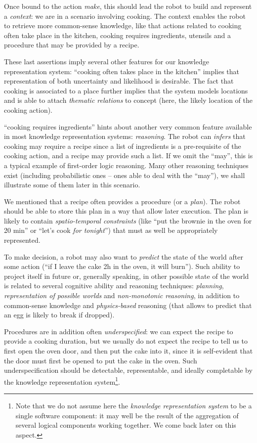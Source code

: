 \documentclass[a4paper, twocolumn]{article}
\begin{document}
Once bound to the action \emph{make}, this should lead the robot to build and
represent a \emph{context}: we are in a scenario involving cooking. The context
enables the robot to retrieve more common-sense knowledge, like that actions
related to cooking often take place in the kitchen, cooking requires
ingredients, utensils and a procedure that may be provided by a recipe.

These last assertions imply several other features for our knowledge
representation system: ``cooking often takes place in the kitchen'' implies
that representation of both uncertainty and likelihood is desirable. The fact
that cooking is associated to a place further implies that the system models
locations and is able to attach \emph{thematic relations} to concept
(here, the likely location of the cooking action).

``cooking requires ingredients'' hints about another very common feature
available in most knowledge representation systems: \emph{reasoning}. The robot
can \emph{infers} that cooking may require a recipe since a list of ingredients
is a pre-requisite of the cooking action, and a recipe may provide such a list.
If we omit the ``may'', this is a typical example of first-order logic
reasoning. Many other reasoning techniques exist (including probabilistic ones
-- ones able to deal with the ``may''), we shall illustrate some of them later
in this scenario.

We mentioned that a recipe often provides a procedure (or a \emph{plan}). The
robot should be able to store this plan in a way that allow later execution.
The plan is likely to contain \emph{spatio-temporal constraints} (like ``put
the brownie in the oven for 20 min'' or ``let's cook \emph{for tonight}'') that
must as well be appropriately represented.

To make decision, a robot may also want to \emph{predict} the state of the world
after some action (``if I leave the cake 2h in the oven, it will burn'').
Such ability to project itself in future or, generally speaking, in other
possible state of the world is related to several cognitive ability and
reasoning techniques: \emph{planning}, \emph{representation of possible worlds}
and \emph{non-monotonic reasoning}, in addition to common-sense knowledge and
\emph{physics-based} reasoning (that allows to predict that an egg is likely to
break if dropped).

Procedures are in addition often \emph{underspecified}: we can expect the recipe
to provide a cooking duration, but we usually do not expect the recipe to tell
us to first open the oven door, and then put the cake into it, since it is
self-evident that the door must first be opened to put the cake in the oven.
Such underspecification should be detectable, representable, and ideally
completable by the knowledge representation system\footnote{Note that we do not
assume here the {\it knowledge representation system} to be a single software
component: it may well be the result of the aggregation of several logical
components working together. We come back later on this aspect.}.
\end{document}
